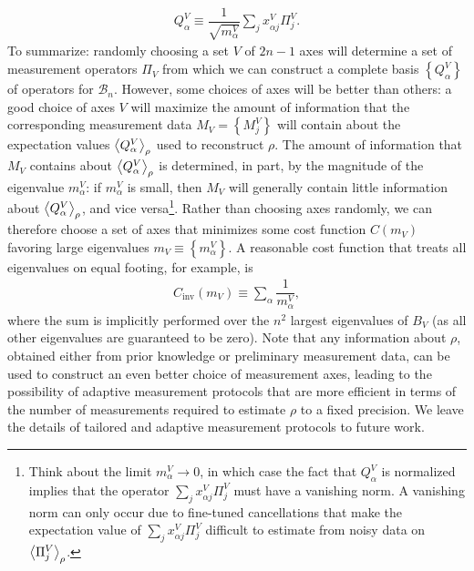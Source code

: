 \documentclass[nofootinbib,notitlepage,11pt]{revtex4-2}
\renewcommand{\t}{\text} %
\newcommand{\f}[2]{\dfrac{#1}{#2}} %
\newcommand{\p}[1]{\left(#1\right)} %
\renewcommand{\set}[1]{\left\{#1\right\}} %
\newcommand{\bk}{\Braket} %
\newcommand{\1}{\mathds{1}}
\newcommand{\B}{\mathcal{B}}
\begin{document}
\begin{align}
  Q^V_\alpha \equiv \f1{\sqrt{m^V_\alpha}} \sum_j x^V_{\alpha j} \Pi^V_j.
\end{align}
To summarize: randomly choosing a set $V$ of $2n-1$ axes will determine a set of measurement operators $\Pi_V$ from which we can construct a complete basis $\set{Q^V_\alpha}$ of operators for $\B_n$.
However, some choices of axes will be better than others: a good choice of axes $V$ will maximize the amount of information that the corresponding measurement data $M_V=\set{M^V_j}$ will contain about the expectation values $\bk{Q^V_\alpha}_\rho$ used to reconstruct $\rho$.
The amount of information that $M_V$ contains about $\bk{Q^V_\alpha}_\rho$ is determined, in part, by the magnitude of the eigenvalue $m^V_\alpha$: if $m^V_\alpha$ is small, then $M_V$ will generally contain little information about $\bk{Q^V_\alpha}_\rho$, and vice versa\footnote{Think about the limit $m^V_\alpha\to0$, in which case the fact that $Q^V_\alpha$ is normalized implies that the operator $\sum_j x^V_{\alpha j} \Pi^V_j$ must have a vanishing norm.
  A vanishing norm can only occur due to fine-tuned cancellations that make the expectation value of $\sum_j x^V_{\alpha j} \Pi^V_j$ difficult to estimate from noisy data on $\bk{\Pi^V_j}_\rho$.}.
Rather than choosing axes randomly, we can therefore choose a set of axes that minimizes some cost function $C\p{m_V}$ favoring large eigenvalues $m_V\equiv\set{m^V_\alpha}$.
A reasonable cost function that treats all eigenvalues on equal footing, for example, is
\begin{align}
  C_{\t{inv}}\p{m_V} \equiv \sum_\alpha \f1{m^V_\alpha},
\end{align}
where the sum is implicitly performed over the $n^2$ largest eigenvalues of $B_V$ (as all other eigenvalues are guaranteed to be zero).
Note that any information about $\rho$, obtained either from prior knowledge or preliminary measurement data, can be used to construct an even better choice of measurement axes, leading to the possibility of adaptive measurement protocols \cite{pereira2018adaptive} that are more efficient in terms of the number of measurements required to estimate $\rho$ to a fixed precision.
We leave the details of tailored and adaptive measurement protocols to future work.


\end{document}
